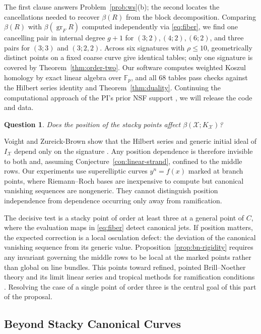 \documentclass[11pt,reqno]{amsart}
\newtheorem{question}[lemma]{Question}
\theoremstyle{remark}
\newcommand{\FF}{\mathbb{F}}
\newcommand{\cX}{\mathcal{X}}
\begin{document}
The first clause answers Problem~\ref{prob:ws}(b); the second locates the cancellations needed to recover $\beta(R)$ from the block decomposition. Comparing $\beta(R)$ with $\beta(\operatorname{gr}_FR)$ computed independently via \eqref{eq:fiber}, we find one cancelling pair in internal degree $g+1$ for $(3;2),(4;2),(6;2)$, and three pairs for $(3;3)$ and $(3;2,2)$. Across six signatures with $\rho\leq10$, geometrically distinct points on a fixed coarse curve give identical tables; only one signature is covered by Theorem~\ref{thm:order-two}. Our software computes weighted Koszul homology by exact linear algebra over $\FF_p$, and all $68$ tables pass checks against the Hilbert series identity and Theorem~\ref{thm:duality}. Continuing the computational approach of the PI's prior NSF support \cite{BEGY20,BCEGLY22}, we will release the code and data.

\begin{question}\label{q:position}
Does the position of the stacky points affect $\beta(\cX;K_{\cX})$?
\end{question}

Voight and Zureick-Brown show that the Hilbert series and generic initial ideal of $I_{\cX}$ depend only on the signature \cite{voightZurieckBrown22}. Any position dependence is therefore invisible to both and, assuming Conjecture~\ref{con:linear-strand}, confined to the middle rows. Our experiments use superelliptic curves $y^n=f(x)$ marked at branch points, where Riemann--Roch bases are inexpensive to compute but canonical vanishing sequences are nongeneric. They cannot distinguish position independence from dependence occurring only away from ramification.

The decisive test is a stacky point of order at least three at a general point of $C$, where the evaluation maps in \eqref{eq:fiber} detect canonical jets. If position matters, the expected correction is a local osculation defect: the deviation of the canonical vanishing sequence from its generic value. Proposition~\ref{prop:bn-rigidity} requires any invariant governing the middle rows to be local at the marked points rather than global on line bundles. This points toward refined, pointed Brill--Noether theory and its limit linear series and tropical methods for ramification conditions \cite{p17,larson21,JR21,CPJ22,LLV25}. Resolving the case of a single point of order three is the central goal of this part of the proposal.
\subsection{Beyond Stacky Canonical Curves}\label{subsec:stacks-further}
\end{document}

